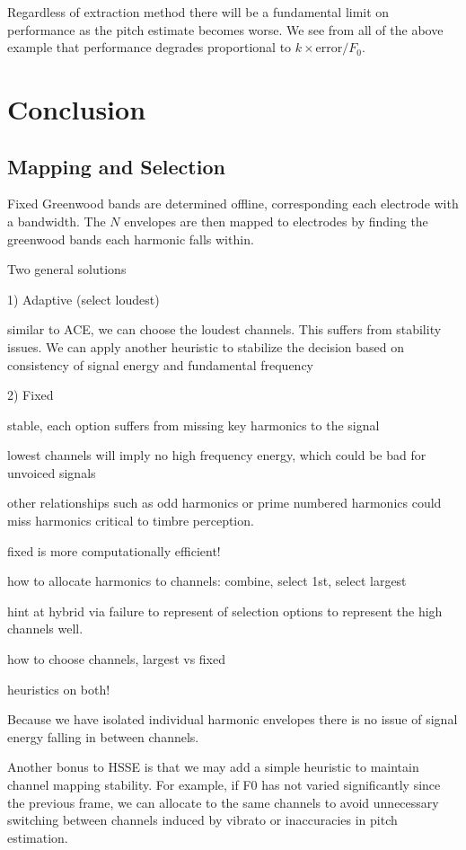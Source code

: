 \documentclass [11pt, proquest,oneside] {ganter_thesis}[2015/03/03]
\begin{document}
Regardless of extraction method there will be a fundamental limit on performance as the pitch estimate becomes worse.  We see from all of the above example that performance degrades proportional to $k \times \mathrm{error} / F_0$.


\chapter{Conclusion}

\section{Mapping and Selection}

Fixed Greenwood bands are determined offline, corresponding each electrode with a bandwidth.  The $N$ envelopes are then mapped to electrodes by finding the greenwood bands each harmonic falls within.

Two general solutions

1) Adaptive (select loudest)

similar to ACE, we can choose the loudest channels.  This suffers from stability issues.  We can apply another heuristic to stabilize the decision based on consistency of signal energy and fundamental frequency

2) Fixed

stable, each option suffers from missing key harmonics to the signal

lowest channels will imply no high frequency energy, which could be bad for unvoiced signals

other relationships such as odd harmonics or prime numbered harmonics could miss harmonics critical to timbre perception.

fixed is more computationally efficient!


how to allocate harmonics to channels: combine, select 1st, select largest

hint at hybrid via failure to represent of selection options to represent the high channels well.

how to choose channels, largest vs fixed

heuristics on both!

Because we have isolated individual harmonic envelopes there is no issue of signal energy falling in between channels.

Another bonus to HSSE is that we may add a simple heuristic to maintain channel mapping stability.  For example, if F0 has not varied significantly since the previous frame, we can allocate to the same channels to avoid unnecessary switching between channels induced by vibrato or inaccuracies in pitch estimation.
\end{document}
